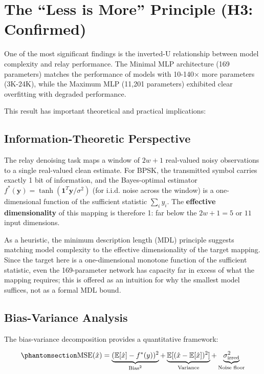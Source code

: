 \section{The ``Less is More'' Principle (H3: Confirmed)}\label{sec:the-less-is-more-principle-h3-confirmed}

One of the most significant findings is the inverted-U relationship between model complexity and relay performance. The Minimal MLP architecture (169 parameters) matches the performance of models with 10-140× more parameters (3K-24K), while the Maximum MLP (11,201 parameters) exhibited clear overfitting with degraded performance.

This result has important theoretical and practical implications:

\subsection{Information-Theoretic Perspective}\label{sec:information-theoretic-perspective}

The relay denoising task maps a window of \(2w+1\) real-valued noisy observations to a single real-valued clean estimate. For BPSK, the transmitted symbol carries exactly 1 bit of information, and the Bayes-optimal estimator \(f^*(\mathbf{y}) = \tanh(\mathbf{1}^T \mathbf{y} / \sigma^2)\) (for i.i.d. noise across the window) is a one-dimensional function of the sufficient statistic \(\sum_i y_i\). The \textbf{effective dimensionality} of this mapping is therefore 1: far below the \(2w+1 = 5\) or \(11\) input dimensions.

As a heuristic, the minimum description length (MDL) principle suggests matching model complexity to the effective dimensionality of the target mapping. Since the target here is a one-dimensional monotone function of the sufficient statistic, even the 169-parameter network has capacity far in excess of what the mapping requires; this is offered as an intuition for why the smallest model suffices, not as a formal MDL bound.

\subsection{Bias-Variance Analysis}\label{sec:bias-variance-analysis}

The bias-variance decomposition \cite{GoodfellowBengioCourville2016DeepLearning} provides a quantitative framework:

\begin{equation}\protect\phantomsection\label{eq:bias-variance-relay}{\text{MSE}(\hat{x}) = \underbrace{(\mathbb{E}[\hat{x}] - f^*(y))^2}_{\text{Bias}^2} + \underbrace{\mathbb{E}[(\hat{x} - \mathbb{E}[\hat{x}])^2]}_{\text{Variance}} + \underbrace{\sigma^2_{\text{irred}}}_{\text{Noise floor}}
}\end{equation}

